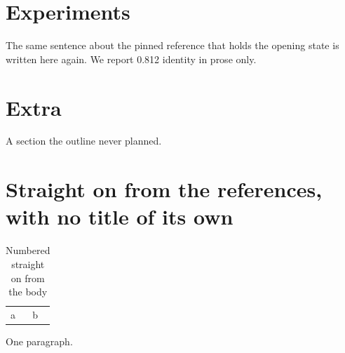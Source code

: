 \documentclass{article}
\begin{document}
\section{Experiments}\label{sec:exp}
The same sentence about the pinned reference that holds the opening state is written here again.
We report 0.812 identity in prose only.
\section{Extra}\label{sec:extra}
A section the outline never planned.
\appendix
\section{Straight on from the references, with no title of its own}\label{app:none}
\begin{table}[t]\caption{Numbered straight on from the body}\begin{tabular}{ll}a&b\end{tabular}\end{table}
One paragraph.
\end{document}

